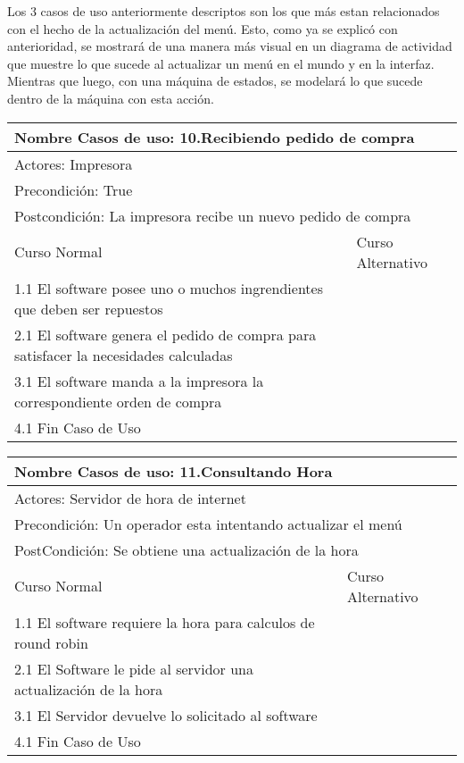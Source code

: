 \documentclass[a4paper,10pt]{article}
\begin{document}
\bigskip

Los 3 casos de uso anteriormente descriptos son los que m\'as estan relacionados con el hecho de la actualizaci\'on del men\'u. Esto, como ya se
explic\'o con anterioridad, se mostrar\'a de una manera m\'as visual en un diagrama de actividad que muestre lo que sucede al actualizar un men\'u
en el mundo y en la interfaz. Mientras que luego, con una m\'aquina de estados, se modelar\'a lo que sucede dentro de la m\'aquina con esta acci\'on.

\bigskip

\begin{center}
\begin{tabularx}{14cm}{|X|X|}
\hline
\multicolumn{2}{|l|}{Nombre Casos de uso: 10.Recibiendo pedido de compra}\\
\hline
\multicolumn{2}{|l|}{Actores: Impresora}\\
\hline
\multicolumn{2}{|l|}{Precondici\'on: True}\\
\hline
\multicolumn{2}{|l|}{Postcondici\'on: La impresora recibe un nuevo pedido de compra}\\
\hline
Curso Normal & Curso Alternativo\\
\hline
1.1 El software posee uno o muchos ingrendientes que deben ser repuestos & 
\\
\hline
2.1 El software genera el pedido de compra para satisfacer la necesidades calculadas & 
\\
\hline
3.1 El software manda a la impresora la correspondiente orden de compra &
\\
\hline
4.1 Fin Caso de Uso &
\\
\hline
\end{tabularx}
\end{center}

\bigskip

\begin{center}
\begin{tabularx}{14cm}{|X|X|}
\hline
\multicolumn{2}{|l|}{Nombre Casos de uso: 11.Consultando Hora}\\
\hline
\multicolumn{2}{|l|}{Actores: Servidor de hora de internet}\\
\hline
\multicolumn{2}{|l|}{Precondici\'on: Un operador esta intentando actualizar el men\'u}\\
\hline
\multicolumn{2}{|l|}{PostCondici\'on: Se obtiene una actualizaci\'on de la hora}\\
\hline
Curso Normal & Curso Alternativo\\
\hline
1.1 El software requiere la hora para calculos de round robin & 
\\
\hline
2.1 El Software le pide al servidor una actualizaci\'on de la hora & 
\\
\hline
3.1 El Servidor devuelve lo solicitado al software &
\\
\hline
4.1 Fin Caso de Uso &
\\
\hline
\end{tabularx}
\end{center}
\end{document}
